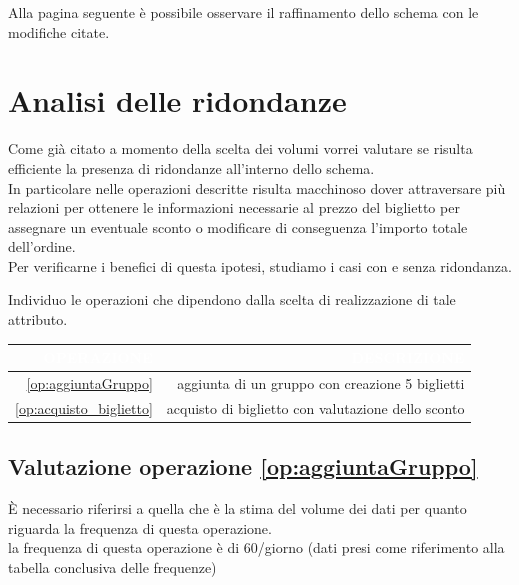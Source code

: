 \documentclass[a4paper,12pt]{report}
\begin{document}
Alla pagina seguente è possibile osservare il raffinamento dello schema con le modifiche citate.


\section{Analisi delle ridondanze}
Come già citato a momento\- della scelta dei volumi vorrei\- valutare se risulta
efficiente la presenza di ridondanze all'interno dello schema.\\ In particolare
nelle operazioni descritte risulta macchinoso dover attraversare più relazioni
per ottenere le informazioni necessarie al prezzo del biglietto per assegnare
un eventuale sconto o modificare di conseguenza l'importo totale dell'ordine.\\
Per verificarne i benefici di questa ipotesi, studiamo i casi con e senza ridondanza.

Individuo le operazioni che dipendono dalla scelta di realizzazione di tale attributo.
\begin{table}[H]
	\centering
	\begin{tabularx}{\textwidth}{|D|D|}
		\hline
		\textcolor{white}{OPERAZIONE} & \color{white}\textcolor{white}{DESCRIZIONE}        \\
		\hline
		\ref{op:aggiuntaGruppo}                     & aggiunta di un gruppo con creazione 5 biglietti    \\
		\hline
		\ref{op:acquisto_biglietto}                 & acquisto di biglietto con valutazione dello sconto \\
		\hline
	\end{tabularx}
\end{table}
\subsection*{Valutazione operazione \ref{op:aggiuntaGruppo}}
È necessario riferirsi a quella che è la stima del volume dei dati per quanto
riguarda la frequenza di questa operazione.\\
la frequenza di questa operazione è di 60/giorno (dati presi come riferimento
alla tabella conclusiva delle frequenze)
\end{document}
